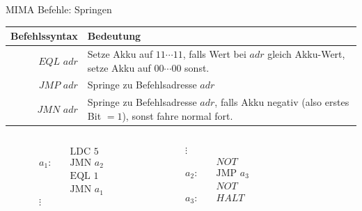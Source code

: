 \documentclass[handout]{beamer}
\begin{document}
\begin{frame}{MIMA Befehle: Springen}
	\begin{tabular}{r | p{8cm} }
		Befehlssyntax & Bedeutung\\\hline\hline 
		$EQL$ $adr$ & Setze Akku auf $11\cdots11$, falls Wert bei $adr$ gleich Akku-Wert, setze Akku auf $00\cdots00$ sonst.\\\hline
		$JMP$ $adr$ & Springe zu Befehlsadresse $adr$\\\hline
		$JMN$ $adr$ & Springe zu Befehlsadresse $adr$, falls Akku negativ (also erstes Bit $=1$), sonst fahre normal fort.
	\end{tabular}
	
	\bp 
	\vspace{.5cm}
	\vspace{.0cm}
	
	\begin{columns}
		\begin{column}{0.25\textwidth}
			\begin{align*}
				& \text{LDC 5} \\
				a_1: \quad  & \text{JMN } a_2 \\
				& \text{EQL 1} \\
				& \text{JMN } a_1 \\
				\vdots
			\end{align*}
		\end{column}
		\begin{column}{0.25\textwidth}
			\begin{align*}
				\vdots \\
				& NOT \\ %
				a_2: \quad & \text{JMP } a_3\\
				& NOT \\ %
				a_3: \quad & HALT
			\end{align*}
		\end{column}
	
		\begin{column}{0.5\textwidth}
			\begin{memory}
			\end{memory}
		\end{column}
	\end{columns}
\end{frame}
\end{document}
